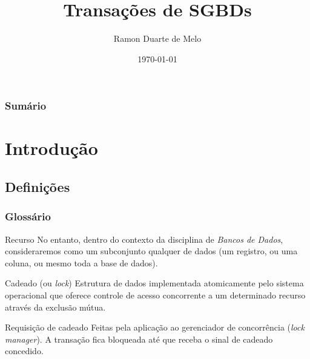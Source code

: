 \documentclass{beamer}
\title[Transações]{Transações de SGBDs} %
\author{Ramon Duarte de Melo} %
\institute[UFRJ] %
{
    Universidade Federal do Rio de Janeiro \\ %
    \medskip
    \textit{ramonduarte@poli.ufrj.br} %
}
\date{\today} %
\begin{document}
\begin{frame}
    \titlepage %
\end{frame}

\begin{frame}
    \frametitle{Sumário} %
    \tableofcontents %
\end{frame}


\section{Introdução} %

\subsection{Definições} %

\begin{frame}
\frametitle{Glossário}
    \begin{block}{Recurso}
        No entanto, dentro do contexto da disciplina de \emph{Bancos de Dados}, consideraremos como um subconjunto qualquer de dados (um registro, ou uma coluna, ou mesmo toda a base de dados). 
    \end{block}
    \begin{block}{Cadeado (ou \emph{lock})}
        Estrutura de dados implementada atomicamente pelo sistema operacional que oferece controle de acesso concorrente a um determinado recurso através da exclusão mútua.
    \end{block}
    \begin{block}{Requisição de cadeado}
        Feitas pela aplicação ao gerenciador de concorrência (\emph{lock manager}). A transação fica bloqueada até que receba o sinal de cadeado concedido.
    \end{block}
\end{frame}
\end{document}
